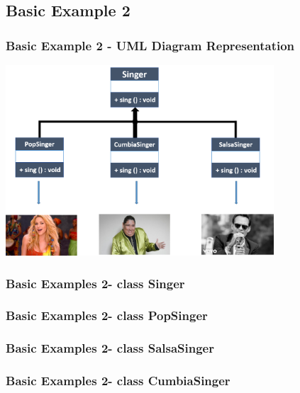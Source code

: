 \documentclass[11pt]{beamer}
\begin{document}
\begin{frame}
\section{Basic Example 2}
\frametitle{Basic Example 2 - UML Diagram Representation}
\begin{center}
{\includegraphics[width=10.0cm]{img/UmlSobreEscritura.png}}
\end{center}
\end{frame}

\begin{frame}
\frametitle{Basic Examples 2- class Singer}

\end{frame}

\begin{frame}
\frametitle{Basic Examples 2- class PopSinger}

\end{frame}

\begin{frame}
\frametitle{Basic Examples 2- class SalsaSinger}

\end{frame}

\begin{frame}
\frametitle{Basic Examples 2- class CumbiaSinger}

\end{frame}
\end{document}
